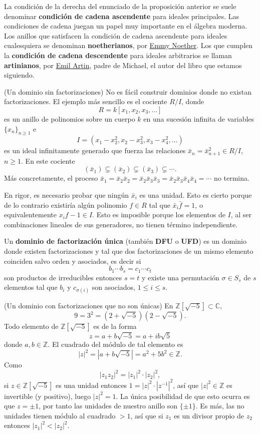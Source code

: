 La condición de la derecha del enunciado de la proposición anterior se
suele denominar \textbf{condición de cadena ascendente} para ideales
principales. Las condiciones de cadena juegan un papel muy importante en
el álgebra moderna. Los anillos que satisfacen la condición de cadena
ascendente para ideales cualesquiera se denominan \textbf{noetherianos},
por \href{https://es.wikipedia.org/wiki/Emmy_Noether}{Emmy Noether}. Los
que cumplen la \textbf{condición de cadena descendente} para ideales
arbitrarios se llaman \textbf{artinianos}, por
\href{https://es.wikipedia.org/wiki/Emil_Artin}{Emil Artin}, padre de
Michael, el autor del libro que estamos siguiendo.

\textrm{\normalfont (Un dominio sin factorizaciones)} No
es fácil construir dominios donde no existan factorizaciones. El ejemplo
más sencillo es el cociente \(R/I\), donde \[R=k[x_1,x_2,x_3,\dots]\]
es un anillo de polinomios sobre un cuerpo \(k\) en una sucesión
infinita de variables \(\{x_n\}_{n\geq 1}\) e
\[I=(x_1-x_2^2, x_2-x_3^2, x_3-x_4^2,\dots)\] es un ideal
infinitamente generado que fuerza las relaciones
\(\bar x_n=\bar x_{n+1}^2\in R/I\), \(n\geq 1\). En este cociente
\[(\bar x_1)\subsetneq(\bar x_2)\subsetneq(\bar x_3)\subsetneq\cdots.\]
Más concretamente, el proceso
\(\bar x_1=\bar x_2\bar x_2=\bar x_2\bar x_3\bar x_3=\bar x_2\bar x_3\bar x_4\bar x_4=\cdots\)
no termina.

En rigor, es necesario probar que ningún \(\bar{x}_i\) es una unidad.
Esto es cierto porque de lo contrario existiría algún polinomio
\(f\in R\) tal que \(\bar{x}_i\bar{f}=1\), o equivalentemente
\(x_if-1\in I\). Esto es imposible porque los elementos de \(I\), al ser
combinaciones lineales de sus generadores, no tienen término
independiente. 


Un \textbf{dominio de factorización única} (también \textbf{DFU} o
\textbf{UFD}) es un dominio donde existen factorizaciones y tal que dos
factorizaciones de un mismo elemento coinciden salvo orden y asociados,
es decir si \[b_1\cdots b_s=c_1\cdots c_t\] son productos de
irreducibles entonces \(s=t\) y existe una permutación
\(\sigma\in S_s\) de \(s\) elementos tal que \(b_i\) y
\(c_{\sigma(i)}\) son asociados, \(1\leq i\leq s\). 

\textrm{\normalfont (Un dominio con factorizaciones que no son únicas)}
En \(\mathbb Z[\sqrt{-5}]\subset\mathbb C\),
\[9=3^2=(2+\sqrt{-5})(2-\sqrt{-5}).\] Todo elemento de
\(\mathbb Z[\sqrt{-5}]\) es de la forma \[z=a+b\sqrt{-5}=a+ib\sqrt{5}\]
donde \(a,b\in\mathbb Z\). El cuadrado del módulo de tal elemento es
\[|z|^2=|a+b\sqrt{-5}|=a^2+5b^2\in\mathbb Z.\] Como
\[|z_1z_2|^2=|z_1|^2\cdot|z_2|^2,\] si \(z\in \mathbb Z[\sqrt{-5}]\) es
una unidad entonces \(1=|z|^2\cdot|z^{-1}|^2\), así que
\(|z|^2\in\mathbb Z\) es invertible (y positivo), luego \(|z|^2=1\). La
única posibilidad de que esto ocurra es que \(z=\pm 1\), por tanto las
unidades de nuestro anillo son \(\{\pm1\}\). Es más, las no unidades
tienen módulo al cuadrado \(>1\), así que si \(z_1\) es un divisor
propio de \(z_2\) entonces \(|z_1|^2<|z_2|^2\).

